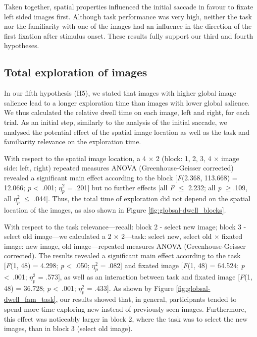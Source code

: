 {Taken together, spatial properties influenced the initial saccade in favour to fixate left sided images first. Although task performance was very high, neither the task nor the familiarity with one of the images had an influence in the direction of the first fixation after stimulus onset. These results fully support our third and fourth hypotheses.

\subsection{Total exploration of images}
\label{sec:results-totalexplorationofimages}
In our fifth hypothesis (H5), we stated that images with higher global image salience lead to a longer exploration time than images with lower global salience. We thus calculated the relative dwell time on each image, left and right, for each trial. As an initial step, similarly to the analysis of the initial saccade, we analysed the potential effect of the spatial image location as well as the task and familiarity relevance on the exploration time. 

With respect to the spatial image location, a 4 $\times$ 2 (block: 1, 2, 3, 4 $\times$ image side: left, right) repeated measures ANOVA (Greenhouse-Geisser corrected) revealed a significant main effect according to the block [\textit{F}(2.368, 113.668) = 12.066; \textit{p} \textless\ .001; \textit{$\eta_p^2$} = .201] but no further effects [all \textit{F} $\leq$ 2.232; all \textit{p} $\geq$.109, all \textit{$\eta_p^2$} $\leq$ .044]. Thus, the total time of exploration did not depend on the spatial location of the images, as also shown in Figure \ref{fig:globsal-dwell_blocks}. 

With respect to the task relevance---recall: block 2 - select new image; block 3 - select old image---we calculated a 2 $\times$ 2---task: select new, select old $\times$ fixated image: new image, old image---repeated measures ANOVA (Greenhouse-Geisser corrected). The results revealed a significant main effect according to the task [\textit{F}(1, 48) = 4.298; \textit{p} \textless\ .050; \textit{$\eta_p^2$} = .082] and fixated image [\textit{F}(1, 48) = 64.524; \textit{p} \textless\ .001; \textit{$\eta_p^2$} = .573], as well as an interaction between task and fixated image [\textit{F}(1, 48) = 36.728; \textit{p} \textless\ .001; \textit{$\eta_p^2$} = .433]. As shown by Figure \ref{fig:globsal-dwell_fam_task}, our results showed that, in general, participants tended to spend more time exploring new instead of previously seen images. Furthermore, this effect was noticeably larger in block 2, where the task was to select the new images, than in block 3 (select old image). 

}

